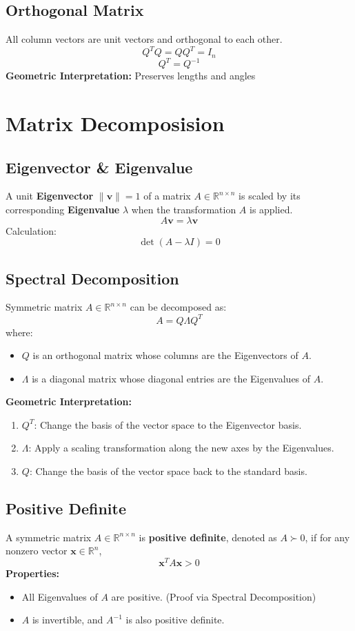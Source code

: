 \documentclass{article}
\begin{document}
\subsection{Orthogonal Matrix}
All column vectors are unit vectors and orthogonal to each other.
\[
    Q^T Q = Q Q^T = I_n
\]
\[
    Q^T = Q^{-1}
\]
\textbf{Geometric Interpretation:} Preserves lengths and angles


\newpage
\section{Matrix Decomposision}

\subsection{Eigenvector \& Eigenvalue}

A unit \textbf{Eigenvector} $\|\mathbf{v}\| = 1$ of a matrix $A \in \mathbb{R}^{n \times n}$ is scaled by its corresponding \textbf{Eigenvalue} $\lambda$ when the transformation $A$ is applied.
\[
    A\mathbf{v} = \lambda \mathbf{v}
\]
Calculation:
\[
    \det(A - \lambda I) = 0
\]

\subsection{Spectral Decomposition}

Symmetric matrix $A \in \mathbb{R}^{n \times n}$ can be decomposed as:
\[
    A = Q \Lambda Q^T
\]
where:
\begin{itemize}
    \item $Q$ is an orthogonal matrix whose columns are the Eigenvectors of $A$.
    \item $\Lambda$ is a diagonal matrix whose diagonal entries are the Eigenvalues of $A$.
\end{itemize}
\textbf{Geometric Interpretation:}
\begin{enumerate}
    \item $Q^T$: Change the basis of the vector space to the Eigenvector basis.
    \item $\Lambda$: Apply a scaling transformation along the new axes by the Eigenvalues.
    \item $Q$: Change the basis of the vector space back to the standard basis.
\end{enumerate}

\subsection{Positive Definite}
A symmetric matrix $A \in \mathbb{R}^{n \times n}$ is \textbf{positive definite}, denoted as $A \succ 0$, if for any nonzero vector $\mathbf{x} \in \mathbb{R}^n$,
\[
    \mathbf{x}^T A \mathbf{x} > 0
\]
\textbf{Properties:}
\begin{itemize}
    \item All Eigenvalues of $A$ are positive. (Proof via Spectral Decomposition)
    \item $A$ is invertible, and $A^{-1}$ is also positive definite.
\end{itemize}
\end{document}
